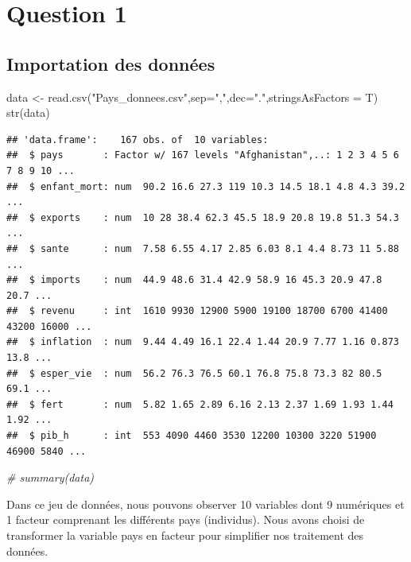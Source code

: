 \documentclass[
]{article}
\newenvironment{Shaded}{\begin{snugshade}}{\end{snugshade}}
\newcommand{\AttributeTok}[1]{\textcolor[rgb]{0.77,0.63,0.00}{#1}}
\newcommand{\CommentTok}[1]{\textcolor[rgb]{0.56,0.35,0.01}{\textit{#1}}}
\newcommand{\FunctionTok}[1]{\textcolor[rgb]{0.00,0.00,0.00}{#1}}
\newcommand{\NormalTok}[1]{#1}
\newcommand{\OtherTok}[1]{\textcolor[rgb]{0.56,0.35,0.01}{#1}}
\newcommand{\StringTok}[1]{\textcolor[rgb]{0.31,0.60,0.02}{#1}}
\begin{document}
\hypertarget{question-1}{%
\section{Question 1}\label{question-1}}

\hypertarget{importation-des-donnuxe9es}{%
\subsection{Importation des données}\label{importation-des-donnuxe9es}}

\begin{Shaded}
\begin{Highlighting}[]
\NormalTok{data }\OtherTok{\textless{}{-}} \FunctionTok{read.csv}\NormalTok{(}\StringTok{"Pays\_donnees.csv"}\NormalTok{,}\AttributeTok{sep=}\StringTok{","}\NormalTok{,}\AttributeTok{dec=}\StringTok{"."}\NormalTok{,}\AttributeTok{stringsAsFactors =}\NormalTok{ T)}
\FunctionTok{str}\NormalTok{(data)}
\end{Highlighting}
\end{Shaded}

\begin{verbatim}
## 'data.frame':    167 obs. of  10 variables:
##  $ pays       : Factor w/ 167 levels "Afghanistan",..: 1 2 3 4 5 6 7 8 9 10 ...
##  $ enfant_mort: num  90.2 16.6 27.3 119 10.3 14.5 18.1 4.8 4.3 39.2 ...
##  $ exports    : num  10 28 38.4 62.3 45.5 18.9 20.8 19.8 51.3 54.3 ...
##  $ sante      : num  7.58 6.55 4.17 2.85 6.03 8.1 4.4 8.73 11 5.88 ...
##  $ imports    : num  44.9 48.6 31.4 42.9 58.9 16 45.3 20.9 47.8 20.7 ...
##  $ revenu     : int  1610 9930 12900 5900 19100 18700 6700 41400 43200 16000 ...
##  $ inflation  : num  9.44 4.49 16.1 22.4 1.44 20.9 7.77 1.16 0.873 13.8 ...
##  $ esper_vie  : num  56.2 76.3 76.5 60.1 76.8 75.8 73.3 82 80.5 69.1 ...
##  $ fert       : num  5.82 1.65 2.89 6.16 2.13 2.37 1.69 1.93 1.44 1.92 ...
##  $ pib_h      : int  553 4090 4460 3530 12200 10300 3220 51900 46900 5840 ...
\end{verbatim}

\begin{Shaded}
\begin{Highlighting}[]
\CommentTok{\# summary(data)}
\end{Highlighting}
\end{Shaded}

Dans ce jeu de données, nous pouvons observer 10 variables dont 9
numériques et 1 facteur comprenant les différents pays (individus). Nous
avons choisi de transformer la variable pays en facteur pour simplifier
nos traitement des données.
\end{document}
